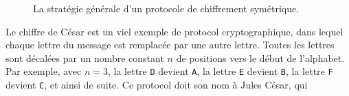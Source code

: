 \begin{figure}[h]
  \centering
  \caption{La stratégie générale d'un protocole de chiffrement symétrique.}
  \label{fig:crypto-sym}
\end{figure}
Le chiffre de César est un viel exemple de protocol cryptographique, dans lequel
chaque lettre du message est remplacée par une autre lettre. Toutes les lettres
sont décalées par un nombre constant $n$ de positions vers le début de
l'alphabet. Par exemple, avec $n=3$, la lettre \texttt{D} devient \texttt{A}, la
lettre \texttt{E} devient \texttt{B}, la lettre \texttt{F} devient
\texttt{C}, et ainsi de suite. Ce protocol doit son nom à Jules César, qui
